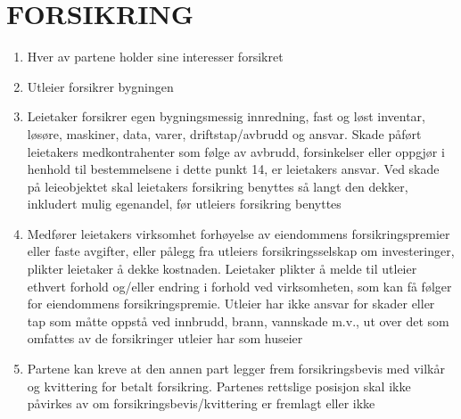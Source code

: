 \section{FORSIKRING}


    \begin{enumerate}

        \item Hver av partene holder sine interesser forsikret

        \item Utleier forsikrer bygningen

        \item Leietaker forsikrer egen bygningsmessig innredning, fast og løst inventar, løsøre, maskiner, data, varer,
        driftstap/avbrudd og ansvar. Skade påført leietakers medkontrahenter som følge av avbrudd, forsinkelser eller
        oppgjør i henhold til bestemmelsene i dette punkt 14, er leietakers ansvar. Ved skade på leieobjektet skal
        leietakers forsikring benyttes så langt den dekker, inkludert mulig egenandel, før utleiers forsikring
        benyttes

        \item Medfører leietakers virksomhet forhøyelse av eiendommens forsikringspremier eller faste avgifter,
        eller pålegg fra utleiers forsikringsselskap om investeringer, plikter leietaker å dekke kostnaden.
        Leietaker plikter å melde til utleier ethvert forhold og/eller endring i forhold ved virksomheten, som kan
        få følger for eiendommens forsikringspremie. Utleier har ikke ansvar for skader eller tap som måtte
        oppstå ved innbrudd, brann, vannskade m.v., ut over det som omfattes av de forsikringer utleier har som
        huseier

        \item Partene kan kreve at den annen part legger frem forsikringsbevis med vilkår og kvittering for betalt
        forsikring. Partenes rettslige posisjon skal ikke påvirkes av om forsikringsbevis/kvittering er fremlagt
        eller ikke

    \end{enumerate}

